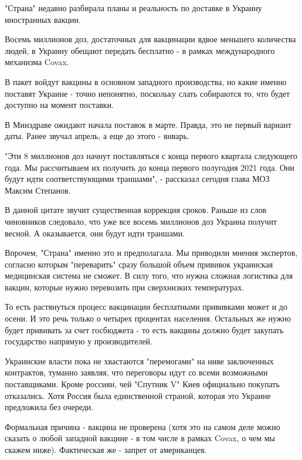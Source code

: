 "Страна" недавно разбирала планы и реальность по доставке в Украину иностранных
вакцин.

Восемь миллионов доз, достаточных для вакцинации вдвое меньшего количества
людей, в Украину обещают передать бесплатно - в рамках международного механизма
Covax. 

В пакет войдут вакцины в основном западного производства, но какие именно
поставят Украине - точно непонятно, поскольку слать собираются то, что будет
доступно на момент поставки. 

В Минздраве ожидают начала поставок в марте. Правда, это не первый вариант
даты. Ранее звучал апрель, а еще до этого - январь. 

"Эти 8 миллионов доз начнут поставляться с конца первого квартала следующего
года. Мы рассчитываем их получить до конца первого полугодия 2021 года. Они
будут идти соответствующими траншами", - рассказал сегодня глава МОЗ Максим
Степанов.

В данной цитате звучит существенная коррекция сроков. Раньше из слов чиновников
следовало, что уже все восемь миллионов доз Украина получит весной. А
оказывается, они будут идти траншами.

Впрочем, "Страна" именно это и предполагала. Мы приводили мнения экспертов,
согласно которым "переварить" сразу большой объем прививок украинская
медицинская система не сможет. В силу того, что нужна сложная логистика для
вакцин, которые нужно перевозить при сверхнизких температурах. 

То есть растянуться процесс вакцинации бесплатными прививками может и до осени.
И это речь только о четырех процентах населения. Остальных же нужно будет
прививать за счет госбюджета - то есть вакцины должно будет закупать
государство напрямую у производителей. 

Украинские власти пока не хвастаются "перемогами" на ниве заключенных
контрактов, туманно заявляя, что переговоры идут со всеми возможными
поставщиками. Кроме россиян, чей "Спутник V" Киев официально покупать
отказались. Хотя Россия была единственной страной, которая это Украине
предложила без очереди. 

Формальная причина - вакцина не проверена (хотя это на самом деле можно сказать
о любой западной вакцине - в том числе в рамках Covax, о чем мы скажем ниже).
Фактическая же - запрет от американцев.

